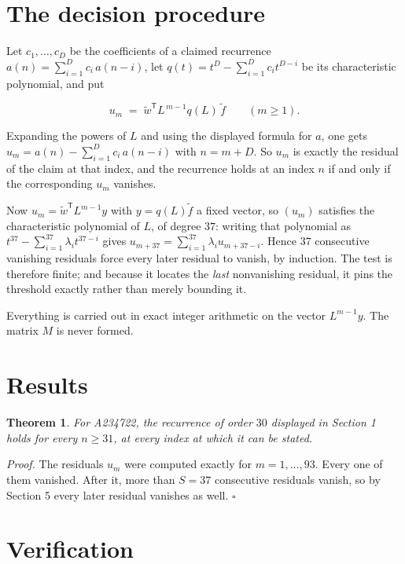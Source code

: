 \documentclass[11pt]{article}
\newtheorem{theorem}{Theorem}
\theoremstyle{definition}
\begin{document}
\section{The decision procedure}

Let $c_1,\dots,c_D$ be the coefficients of a claimed recurrence $a(n) = \sum_{i=1}^{D} c_i\,a(n-i)$, let $q(t) = t^{D} - \sum_{i=1}^{D} c_i t^{D-i}$ be its characteristic polynomial, and put

\[u_m \;=\; \tilde w^{\mathsf T} L^{\,m-1} q(L)\,\tilde f \qquad (m \ge 1).\]

Expanding the powers of $L$ and using the displayed formula for $a$, one gets $u_m = a(n) - \sum_{i=1}^{D} c_i\,a(n-i)$ with $n = m + D$. So $u_m$ is exactly the residual of the claim at that index, and the recurrence holds at an index $n$ if and only if the corresponding $u_m$ vanishes.

Now $u_m = \tilde w^{\mathsf T} L^{m-1} y$ with $y = q(L)\tilde f$ a fixed vector, so $(u_m)$ satisfies the characteristic polynomial of $L$, of degree $37$: writing that polynomial as $t^{37} - \sum_{i=1}^{37} \lambda_i t^{37-i}$ gives $u_{m+37} = \sum_{i=1}^{37} \lambda_i u_{m+37-i}$. Hence $37$ consecutive vanishing residuals force every later residual to vanish, by induction. The test is therefore finite; and because it locates the {\itshape last} nonvanishing residual, it pins the threshold exactly rather than merely bounding it.

Everything is carried out in exact integer arithmetic on the vector $L^{m-1}y$. The matrix $M$ is never formed.

\section{Results}

\begin{theorem} For A234722, the recurrence of order $30$ displayed in Section 1 holds for every $n \ge 31$, at every index at which it can be stated.\end{theorem}

{\itshape Proof.} The residuals $u_m$ were computed exactly for $m = 1,\dots,93$. Every one of them vanished. After it, more than $S = 37$ consecutive residuals vanish, so by Section 5 every later residual vanishes as well. $\square$

\section{Verification}
\end{document}
